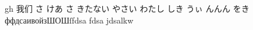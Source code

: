 \documentclass{article}
\begin{document}
gh
我们
さ けあ さ きたない やさい
わたし
しき うぃ んんん をき
ффдсаивойзШОШſfdsa
fdsa
jdsalkw
\end{document}
